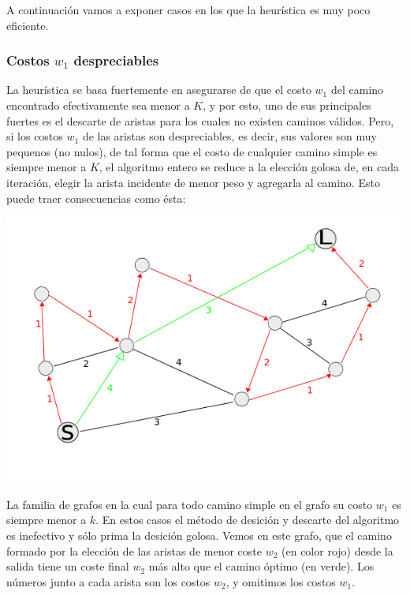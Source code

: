 A continuaci\'on vamos a exponer casos en los que la heur\'istica es muy poco eficiente.
\subsubsection{Costos $w_1$ despreciables}

La heur\'istica se basa fuertemente en asegurarse de que el costo $w_1$ del camino encontrado efectivamente sea menor a $K$, y por esto, uno de sus principales fuertes es el descarte de aristas para los cuales no existen caminos v\'alidos. Pero, si los costos $w_1$ de las aristas son despreciables, es decir, sus valores son muy pequenos (no nulos), de tal forma que el costo de cualquier camino simple es siempre menor a $K$, el algoritmo entero se reduce a la elecci\'on golosa de, en cada iteraci\'on, elegir la arista incidente de menor peso y agregarla al camino. Esto puede traer consecuencias como \'esta:

\begin{center}
\includegraphics[scale=0.7]{img/grafoCaminoMasLargo.png}
\end{center}
\vspace{2mm}

La familia de grafos en la cual para todo camino simple en el grafo su costo $w_1$ es siempre menor a $k$. En estos casos el m\'etodo de desici\'on y descarte del algoritmo es inefectivo y s\'olo prima la desici\'on golosa. Vemos en este grafo, que el camino formado por la elecci\'on de las aristas de menor coste $w_2$ (en color rojo) desde la salida tiene un coste final $w_2$ m\'as alto que el camino \'optimo (en verde). Los n\'umeros junto a cada arista son los costos $w_2$, y omitimos los costos $w_1$.

